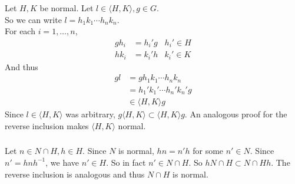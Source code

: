 \documentclass{article}
\newcommand{\inv}[1]{ {#1}^{-1} }
\newcommand{\cyclic}[1]{\langle#1\rangle}
\begin{document}
\subsubsection{}\label{ex1p23}
Let $H,K$ be normal. Let $l\in \cyclic{H,K}, g\in G$.\\
So we can write $l=h_1k_1\cdots h_nk_n$.\\
For each $i=1,\ldots,n$,
\begin{align*}
gh_i &= h_i'g & h_i'\in H\\
hk_i &= k_i'h & k_i'\in K
\end{align*}
And thus
\begin{align*}
gl &= gh_1k_1\cdots h_nk_n\\
&= h_1'k_1'\cdots h_n'k_n'g\\
&\in \cyclic{H,K}g
\end{align*}
Since $l \in \cyclic{H,K}$ was arbitrary, $g\cyclic{H,K} \subset \cyclic{H,K}g$. An analogous proof for the reverse inclusion makes $\cyclic{H,K}$ normal.
\subsubsection{}\label{ex1p24}
Let $n\in N\cap H, h\in H$. Since $N$ is normal, $hn=n'h$ for some $n'\in N$. Since $n'=hn\inv{h}$, we have $n'\in H$. So in fact $n'\in N\cap H$. So $hN\cap H \subset N\cap Hh$. The reverse inclusion is analogous and thus $N\cap H$ is normal.
\end{document}
